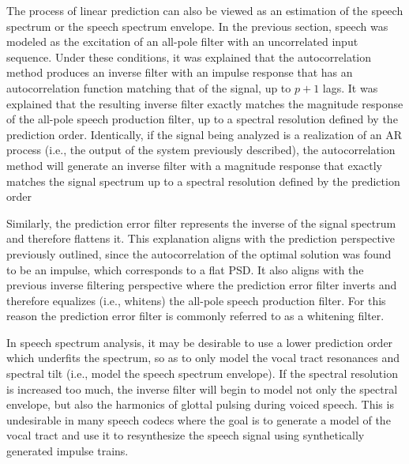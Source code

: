 The process of linear prediction can also be viewed as an estimation of the speech spectrum or the speech spectrum envelope. In the previous section, speech was modeled as the excitation of an all-pole filter with an uncorrelated input sequence. Under these conditions, it was explained that the autocorrelation method produces an inverse filter with an impulse response that has an autocorrelation function matching that of the signal, up to $p+1$ lags. It was explained that the resulting inverse filter exactly matches the magnitude response of the all-pole speech production filter, up to a spectral resolution defined by the prediction order. Identically, if the signal being analyzed is a realization of an AR process (i.e., the output of the system previously described), the autocorrelation method will generate an inverse filter with a magnitude response that exactly matches the signal  spectrum up to a spectral resolution defined by the prediction order

Similarly, the prediction error filter represents the inverse of the signal spectrum and therefore flattens it. This explanation aligns with the prediction perspective previously outlined, since the autocorrelation of the optimal solution was found to be an impulse, which corresponds to a flat PSD. It also aligns with the previous inverse filtering perspective where the prediction error filter inverts and therefore equalizes (i.e., whitens) the all-pole speech production filter. For this reason the prediction error filter is commonly referred to as a whitening filter. 

In speech spectrum analysis, it may be desirable to use a lower prediction order which underfits the spectrum, so as to only model the vocal tract resonances and spectral tilt (i.e., model the speech spectrum envelope). If the spectral resolution is increased too much, the inverse filter will begin to model not only the spectral envelope, but also the harmonics of glottal pulsing during voiced speech. This is undesirable in many speech codecs where the goal is to generate a model of the vocal tract and use it to resynthesize the speech signal using synthetically generated impulse trains.




